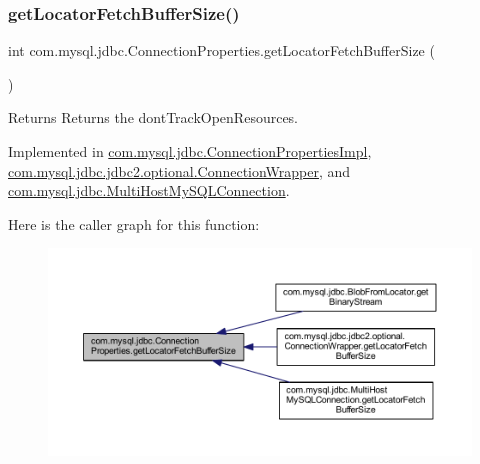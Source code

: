 \subsubsection{\texorpdfstring{get\+Locator\+Fetch\+Buffer\+Size()}{getLocatorFetchBufferSize()}}
{\footnotesize\ttfamily int com.\+mysql.\+jdbc.\+Connection\+Properties.\+get\+Locator\+Fetch\+Buffer\+Size (\begin{DoxyParamCaption}{ }\end{DoxyParamCaption})}

\begin{DoxyReturn}{Returns}
Returns the dont\+Track\+Open\+Resources. 
\end{DoxyReturn}


Implemented in \mbox{\hyperlink{classcom_1_1mysql_1_1jdbc_1_1_connection_properties_impl_a34a794bd635dc127a75c1d1728078553}{com.\+mysql.\+jdbc.\+Connection\+Properties\+Impl}}, \mbox{\hyperlink{classcom_1_1mysql_1_1jdbc_1_1jdbc2_1_1optional_1_1_connection_wrapper_a4232a575ece7c1b11147d5947bd7404c}{com.\+mysql.\+jdbc.\+jdbc2.\+optional.\+Connection\+Wrapper}}, and \mbox{\hyperlink{classcom_1_1mysql_1_1jdbc_1_1_multi_host_my_s_q_l_connection_a681a0098d027412f890b819e9caa4e1d}{com.\+mysql.\+jdbc.\+Multi\+Host\+My\+S\+Q\+L\+Connection}}.

Here is the caller graph for this function\+:\nopagebreak
\begin{figure}[H]
\begin{center}
\leavevmode
\includegraphics[width=350pt]{interfacecom_1_1mysql_1_1jdbc_1_1_connection_properties_a9e88b2b4823f85f1ce0a95b4a7b9b5d5_icgraph}
\end{center}
\end{figure}
\mbox{\label{interfacecom_1_1mysql_1_1jdbc_1_1_connection_properties_aab196f0a4527adf8f56c13b2530fbd23}} 
